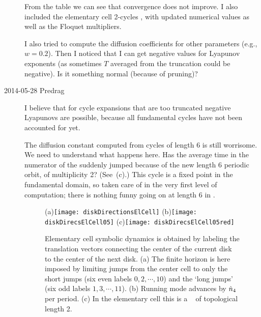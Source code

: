 \begin{description}
From the table  we can see that convergence does not
improve. I also included the elementary cell 2-cycles
, with updated numerical values as well as
the Floquet multipliers.

I also tried to compute the diffusion coefficients for other parameters
(e.g., $w=0.2$). Then I noticed that I can get negative values for
Lyapunov exponents (as sometimes $T$ averaged from the truncation could
be negative). Is it something normal (because of pruning)?

\item[2014-05-28 Predrag]
I believe that for cycle expansions that are too truncated negative
Lyapunovs are possible, because all  fundamental cycles have not been
accounted for yet.

The diffusion constant computed from cycles of length 6 is still
worrisome. We need to understand what happens here. Has the average time
in the numerator of the {\cycForm}  suddenly jumped
because of the new length 6 periodic orbit, of multiplicity 2?
(See \,(c).)
This cycle is a fixed point in the fundamental domain, so taken care of
in the very first level of computation; there is nothing funny going on
at length 6 in .



\begin{figure}
\begin{center}
(a)\texttt{[image: diskDirectionsElCell]}
(b)\texttt{[image: diskDirecsElCell05]}
(c)\texttt{[image: diskDirecsElCell05red]}
\end{center}
\caption{
Elementary cell symbolic dynamics is obtained by labeling the translation
vectors connecting the center of the current disk to the center of the
next disk.
(a) The finite horizon is here imposed by limiting jumps from the
center cell to only the short jumps (six even labels $0, 2,\cdots,10$)
and the `long jumps' (six odd labels $1, 3,\cdots,11$).
(b) Running mode  advances by $\hat n_4$ per period.
(c) In the elementary cell this is a \po\ 
    of topological length 2.
    }
\label{diskDirectionsElCell}
\end{figure}


\end{description}
